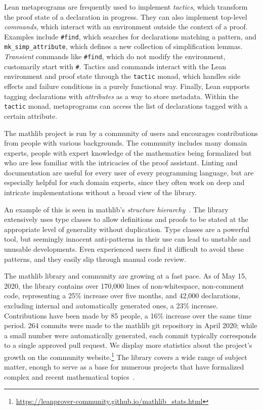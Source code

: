 \documentclass[runningheads]{llncs}
\newcommand{\mathlib}{\textsf{mathlib}\xspace}
\newcommand{\lean}[1]{\lstinline[language=lean]{#1}}
\begin{document}
Lean metaprograms are frequently used to implement \emph{tactics},
which transform the proof state of a declaration in progress.
They can also implement top-level \emph{commands},
which interact with an environment outside the context of a proof.
Examples include
\lean{#find}, which searches for declarations matching a pattern,
and \lean{mk_simp_attribute}, which defines a new collection of simplification lemmas.
\emph{Transient} commands like \lean{#find},
which do not modify the environment,
customarily start with \lean{#}.
Tactics and commands interact with the Lean environment and proof state
through the \lean{tactic} monad,
which handles side effects and failure conditions
in a purely functional way. %
Finally, Lean supports tagging declarations with \emph{attributes}
as a way to store metadata.
Within the \lean{tactic} monad,
metaprograms can access the list of declarations tagged with a certain attribute.

The \mathlib project is run by a community of users
and encourages contributions from people with various backgrounds.
The community includes many domain experts,
people with expert knowledge of the mathematics being formalized
but who are less familiar with the intricacies of the proof assistant.
Linting and documentation are useful
for every user of every programming language,
but are especially helpful for such domain experts,
since they often work on deep and intricate implementations
without a broad view of the library.

An example of this is seen in \mathlib's \emph{structure hierarchy}~\cite[Sect.\ 4]{mathlib20}.
The library extensively uses type classes
to allow definitions and proofs to be stated
at the appropriate level of generality
without duplication.
Type classes are a powerful tool,
but seemingly innocent anti-patterns in their use
can lead to unstable and unusable developments.
Even experienced users find it difficult to avoid these patterns,
and they easily slip through manual code review.

The \mathlib library and community are growing at a fast pace.
As of May 15, 2020, 
the library contains over 170,000 lines of non-whitespace, non-comment code,
representing a 25\% increase over five months,
and 42,000 %
declarations, excluding internal and automatically generated ones,
a 23\% increase.
Contributions have been made by 85 people,
a 16\% increase over the same time period.
264 commits were made to the \mathlib git repository in April 2020;
while a small number were automatically generated,
each commit typically corresponds to a single approved pull request.
We display more statistics about the project's growth on the community website.\footnote{
  \url{https://leanprover-community.github.io/mathlib_stats.html}
}
The library covers a wide range of subject matter,
enough to serve as a base for numerous projects
that have formalized complex and recent mathematical topics~\cite{BCM20,Dahm19,Han20}.
\end{document}

